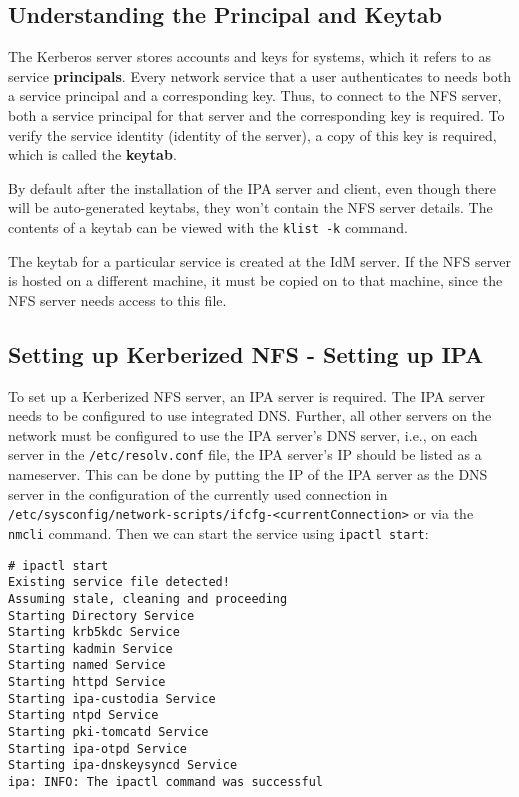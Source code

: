 \subsection{Understanding the Principal and Keytab}
The Kerberos server stores accounts and keys for systems, which it refers to as service \textbf{principals}. Every network service that a user authenticates to needs both a service principal and a corresponding key. Thus, to connect to the NFS server, both a service principal for that server and the corresponding key is required. To verify the service identity (identity of the server), a copy of this key is required, which is called the \textbf{keytab}. 

By default after the installation of the IPA server and client, even though there will be auto-generated keytabs, they won't contain the NFS server details. The contents of a keytab can be viewed with the \verb|klist -k| command. 

The keytab for a particular service is created at the IdM server. If the NFS server is hosted on a different machine, it must be copied on to that machine, since the NFS server needs access to this file. 

\subsection{Setting up Kerberized NFS - Setting up IPA}
To set up a Kerberized NFS server, an IPA server is required. The IPA server needs to be configured to use integrated DNS. Further, all other servers on the network must be configured to use the IPA server's DNS server, i.e., on each server in the \verb|/etc/resolv.conf| file, the IPA server's IP should be listed as a nameserver. This can be done by putting the IP of the IPA server as the DNS server in the configuration of the currently used connection in \verb|/etc/sysconfig/network-scripts/ifcfg-<currentConnection>| or via the \verb|nmcli| command. Then we can start the service using \verb|ipactl start|:

\vspace{-15pt}
\begin{verbatim}
# ipactl start
Existing service file detected!
Assuming stale, cleaning and proceeding
Starting Directory Service
Starting krb5kdc Service
Starting kadmin Service
Starting named Service
Starting httpd Service
Starting ipa-custodia Service
Starting ntpd Service
Starting pki-tomcatd Service
Starting ipa-otpd Service
Starting ipa-dnskeysyncd Service
ipa: INFO: The ipactl command was successful
\end{verbatim}
\vspace{-10pt}	

